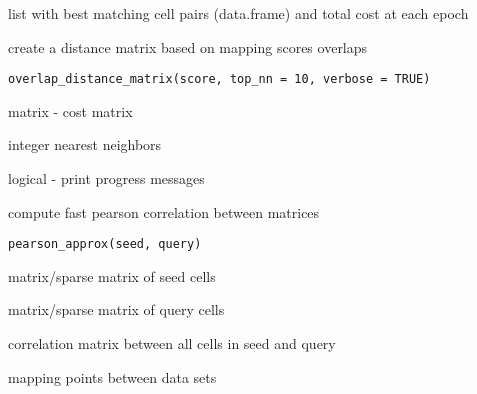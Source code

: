 \documentclass[a4paper]{book}
\begin{document}
%
\begin{Value}
list with best matching cell pairs (data.frame) and 
total cost at each epoch
\end{Value}
%
\begin{Description}
create a distance matrix based on mapping scores overlaps
\end{Description}
%
\begin{Usage}
\begin{verbatim}
overlap_distance_matrix(score, top_nn = 10, verbose = TRUE)
\end{verbatim}
\end{Usage}
%
\begin{Arguments}
\begin{ldescription}
\item[\code{score}] matrix - cost matrix

\item[\code{top\_nn}] integer nearest neighbors

\item[\code{verbose}] logical - print progress messages
\end{ldescription}
\end{Arguments}
%
\begin{Description}
compute fast pearson correlation between matrices
\end{Description}
%
\begin{Usage}
\begin{verbatim}
pearson_approx(seed, query)
\end{verbatim}
\end{Usage}
%
\begin{Arguments}
\begin{ldescription}
\item[\code{seed}] matrix/sparse matrix of seed cells

\item[\code{query}] matrix/sparse matrix of query cells
\end{ldescription}
\end{Arguments}
%
\begin{Value}
correlation matrix between all cells in seed and query
\end{Value}
%
\begin{Description}
mapping points between data sets
\end{Description}
\end{document}
